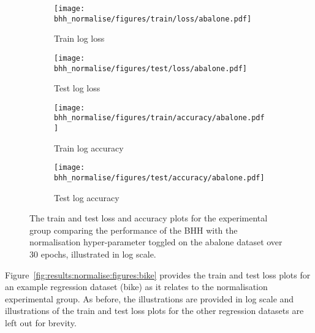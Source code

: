 \begin{figure}[htbp]
      \begin{subfigure}{0.5\textwidth}
            \centering
            \texttt{[image: bhh\_normalise/figures/train/loss/abalone.pdf]}
            \caption{Train log loss}
            \label{fig:results:normalise:figures:loss:train:abalone}
      \end{subfigure}
      \begin{subfigure}{0.5\textwidth}
            \centering
            \texttt{[image: bhh\_normalise/figures/test/loss/abalone.pdf]}
            \caption{Test log loss}
            \label{fig:results:normalise:figures:loss:test:abalone}
      \end{subfigure}
      \par\bigskip
      \begin{subfigure}{0.5\textwidth}
            \centering
            \texttt{[image: bhh\_normalise/figures/train/accuracy/abalone.pdf]}
            \caption{Train log accuracy}
            \label{fig:results:normalise:figures:accuracy:train:abalone}
      \end{subfigure}
      \begin{subfigure}{0.5\textwidth}
            \centering
            \texttt{[image: bhh\_normalise/figures/test/accuracy/abalone.pdf]}
            \caption{Test log accuracy}
            \label{fig:results:normalise:figures:accuracy:test:abalone}
      \end{subfigure}
      \par\bigskip
      \caption{The train and test loss and accuracy plots for the experimental group comparing the performance of the \acs{BHH} with the normalisation hyper-parameter toggled on the abalone dataset over 30 epochs, illustrated in log scale.}
      \label{fig:results:normalise:figures:abalone}
\end{figure}


Figure~\ref{fig:results:normalise:figures:bike} provides the train and test loss plots for an example regression dataset (bike) as it relates to the normalisation experimental group. As before, the illustrations are provided in log scale and illustrations of the train and test loss plots for the other regression datasets are left out for brevity.


